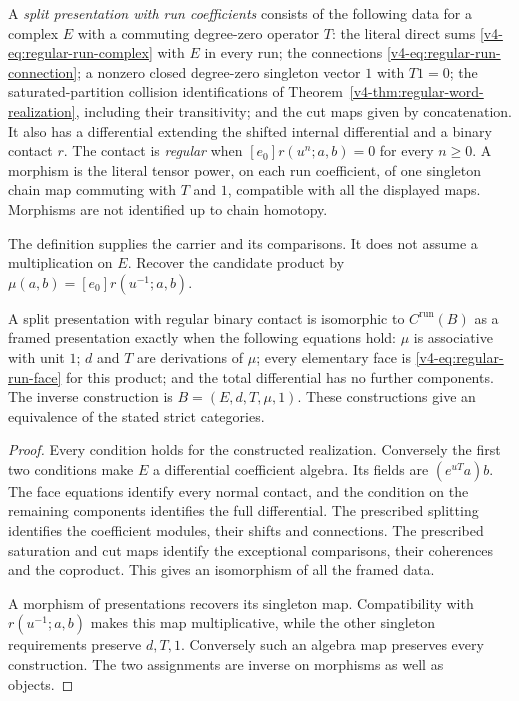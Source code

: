 \begin{definition}\label{v4-def:regular-split-presentation}
A \emph{split presentation with run coefficients} consists
of the following data for a complex \(E\) with a commuting
degree-zero operator \(T\):
the literal direct sums
\eqref{v4-eq:regular-run-complex} with \(E\) in every run;
the connections \eqref{v4-eq:regular-run-connection};
a nonzero closed degree-zero singleton vector \(1\) with \(T1=0\);
the saturated-partition collision identifications of
Theorem~\ref{v4-thm:regular-word-realization}, including
their transitivity; and the cut maps given by concatenation.
It also has a differential extending the shifted
internal differential and a binary contact \(r\).
The contact is \emph{regular} when
\([e_0]r(u^n;a,b)=0\) for every \(n\geq0\).
A morphism is the literal tensor power, on each run
coefficient, of one singleton chain map commuting with
\(T\) and \(1\), compatible with all the displayed maps.
Morphisms are not identified up to chain homotopy.
\end{definition}

The definition supplies the carrier and its comparisons.
It does not assume a multiplication on \(E\). Recover
the candidate product by
\(\mu(a,b)=[e_0]r(u^{-1};a,b)\).

\begin{theorem}
\label{v4-thm:regular-framed-recognition}
A split presentation with regular binary contact is
isomorphic to \(C^{\mathrm{run}}(B)\) as a framed
presentation exactly when the following equations hold:
\(\mu\) is associative with unit \(1\); \(d\) and \(T\)
are derivations of \(\mu\); every elementary face is
\eqref{v4-eq:regular-run-face} for this product; and
the total differential has no further components.
The inverse construction is \(B=(E,d,T,\mu,1)\).
These constructions give an equivalence of the stated
strict categories.
\end{theorem}

\begin{proof}
Every condition holds for the constructed realization.
Conversely the first two conditions make \(E\) a
differential coefficient algebra. Its fields are
\((e^{uT}a)b\). The face equations identify every
normal contact, and the condition on the remaining
components identifies the full differential.
The prescribed splitting identifies the coefficient
modules, their shifts and connections. The prescribed
saturation and cut maps identify the exceptional
comparisons, their coherences and the coproduct.
This gives an isomorphism of all the framed data.

A morphism of presentations recovers its singleton
map. Compatibility with \(r(u^{-1};a,b)\) makes this
map multiplicative, while the other singleton
requirements preserve \(d,T,1\). Conversely such an
algebra map preserves every construction. The two
assignments are inverse on morphisms as well as objects.
\end{proof}

